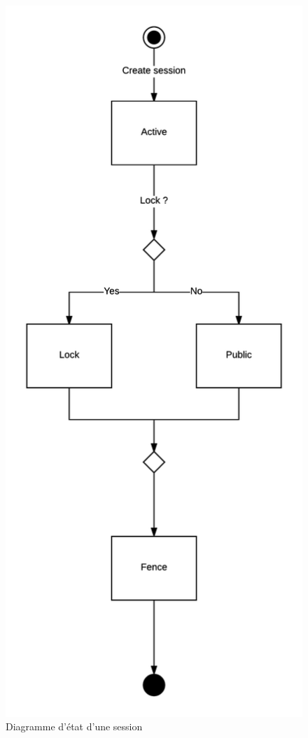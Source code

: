 \documentclass[titlepage, 12pt]{report}
\begin{document}
\begin{figure}[!h]
	\caption{Diagramme d'état d'une session}
	\label{state_session_diagram}
	\centering
	\includegraphics[scale=0.8]{Images/diagram/state_session_diagram.png}
\end{figure}
\end{document}
